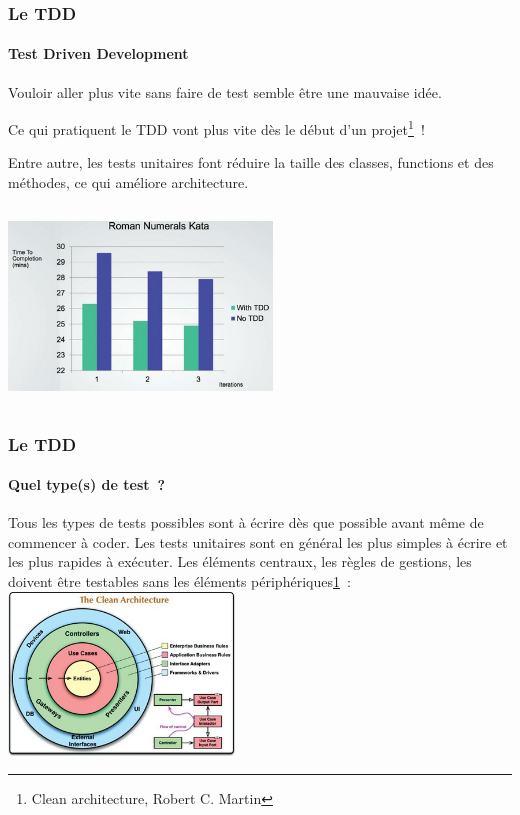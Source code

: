 \documentclass{beamer}
\begin{document}
    \begin{frame}
        \transdissolve
        \frametitle{Le TDD}
        \framesubtitle{Test Driven Development}
        Vouloir aller plus vite sans faire de test semble être une mauvaise idée.

        Ce qui pratiquent le TDD vont plus vite dès le début d'un projet\footnote{\label{cleanarchitecture}Clean architecture, Robert C. Martin}~!

        Entre autre, les tests unitaires font réduire la taille des classes, functions et des méthodes, ce qui améliore architecture.
        \begin{columns}
            \centering
            \includegraphics[width=7cm]{image/tdd-vs-no-tdd}
        \end{columns}
    \end{frame}

    \begin{frame}
        \transdissolve
        \frametitle{Le TDD}
        \framesubtitle{Quel type(s) de test~?}
        Tous les types de tests possibles sont à écrire dès que possible avant même de commencer à coder.
        Les tests unitaires sont en général les plus simples à écrire et les plus rapides à exécuter.
        \bigbreak
        Les éléments centraux, les règles de gestions, les  doivent être testables sans les éléments périphériques\cref{cleanarchitecture}~:
        \bigbreak
        \centering
        \includegraphics[width=6cm]{image/the-clean-architecture}
    \end{frame}
\end{document}
